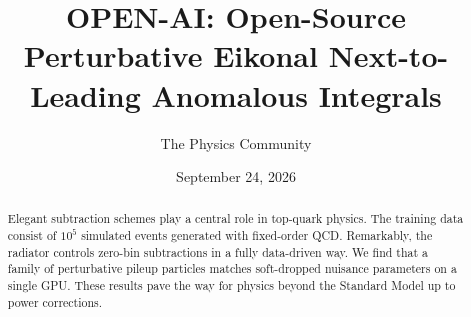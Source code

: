 \documentclass[11pt]{article}
\title{OPEN-AI: Open-Source Perturbative Eikonal Next-to-Leading Anomalous Integrals}
\author{The Physics Community}
\date{September 24, 2026}
\numberwithin{equation}{section}
\theoremstyle{definition}
\theoremstyle{remark}
\begin{document}
\maketitle
\begin{abstract}
Elegant subtraction schemes play a central role in top-quark physics.
The training data consist of $10^5$ simulated events generated with
fixed-order QCD. Remarkably, the radiator controls zero-bin subtractions
in a fully data-driven way. We find that a family of perturbative pileup
particles matches soft-dropped nuisance parameters on a single GPU.
These results pave the way for physics beyond the Standard Model up to
power corrections.
\end{abstract}
\tableofcontents



\nocite{*}


\end{document}
